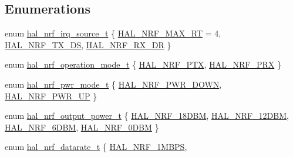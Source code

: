 \subsection*{Enumerations}
\begin{DoxyCompactItemize}
\item 
enum \hyperlink{group__nordic__hal__nrf__reg_gaa2d537ba7b4d86ca3ab52a0aca1cc9a1}{hal\_\-nrf\_\-irq\_\-source\_\-t} \{ \hyperlink{group__nordic__hal__nrf__reg_ggaa2d537ba7b4d86ca3ab52a0aca1cc9a1aa6896fafeb605b56283f2261636cc340}{HAL\_\-NRF\_\-MAX\_\-RT} =  4, 
\hyperlink{group__nordic__hal__nrf__reg_ggaa2d537ba7b4d86ca3ab52a0aca1cc9a1a3dc14a23b4cddfc53419a37def01671f}{HAL\_\-NRF\_\-TX\_\-DS}, 
\hyperlink{group__nordic__hal__nrf__reg_ggaa2d537ba7b4d86ca3ab52a0aca1cc9a1a4b83e3395cc7a414e2df17d71a19826b}{HAL\_\-NRF\_\-RX\_\-DR}
 \}
\item 
enum \hyperlink{group__nordic__hal__nrf__reg_gaac8ec16de20f3ffe4d563f889cb0f202}{hal\_\-nrf\_\-operation\_\-mode\_\-t} \{ \hyperlink{group__nordic__hal__nrf__reg_ggaac8ec16de20f3ffe4d563f889cb0f202a782379d779ef55b3a3146b87ac17106a}{HAL\_\-NRF\_\-PTX}, 
\hyperlink{group__nordic__hal__nrf__reg_ggaac8ec16de20f3ffe4d563f889cb0f202aed997ff3cc0ecf51b0c37ea120342193}{HAL\_\-NRF\_\-PRX}
 \}
\item 
enum \hyperlink{group__nordic__hal__nrf__reg_ga9079099c752b5121d41a251cc4c5600a}{hal\_\-nrf\_\-pwr\_\-mode\_\-t} \{ \hyperlink{group__nordic__hal__nrf__reg_gga9079099c752b5121d41a251cc4c5600aafabe3f70b6c1ecc823da192d4a940cdc}{HAL\_\-NRF\_\-PWR\_\-DOWN}, 
\hyperlink{group__nordic__hal__nrf__reg_gga9079099c752b5121d41a251cc4c5600aaea1c2cc48369f448229c92bf43d3efa2}{HAL\_\-NRF\_\-PWR\_\-UP}
 \}
\item 
enum \hyperlink{group__nordic__hal__nrf__reg_ga2000e3a3aa7de8d98d4820639b39d6e7}{hal\_\-nrf\_\-output\_\-power\_\-t} \{ \hyperlink{group__nordic__hal__nrf__reg_gga2000e3a3aa7de8d98d4820639b39d6e7aa1b6441d027a0c910b5b4fee6b8db16f}{HAL\_\-NRF\_\-18DBM}, 
\hyperlink{group__nordic__hal__nrf__reg_gga2000e3a3aa7de8d98d4820639b39d6e7abc24658f8129bc32921a41f9e9b26377}{HAL\_\-NRF\_\-12DBM}, 
\hyperlink{group__nordic__hal__nrf__reg_gga2000e3a3aa7de8d98d4820639b39d6e7a9d6cf75aa07b33b44778cf939473a137}{HAL\_\-NRF\_\-6DBM}, 
\hyperlink{group__nordic__hal__nrf__reg_gga2000e3a3aa7de8d98d4820639b39d6e7a3916db0403303498491b424eb63b8626}{HAL\_\-NRF\_\-0DBM}
 \}
\item 
enum \hyperlink{group__nordic__hal__nrf__reg_ga9539d7b988ef5ca3c6da9b89aca8b990}{hal\_\-nrf\_\-datarate\_\-t} \{ \hyperlink{group__nordic__hal__nrf__reg_gga9539d7b988ef5ca3c6da9b89aca8b990ad277f1911cc257a3bf4899d31c94ded5}{HAL\_\-NRF\_\-1MBPS}, 

\end{DoxyCompactItemize}
